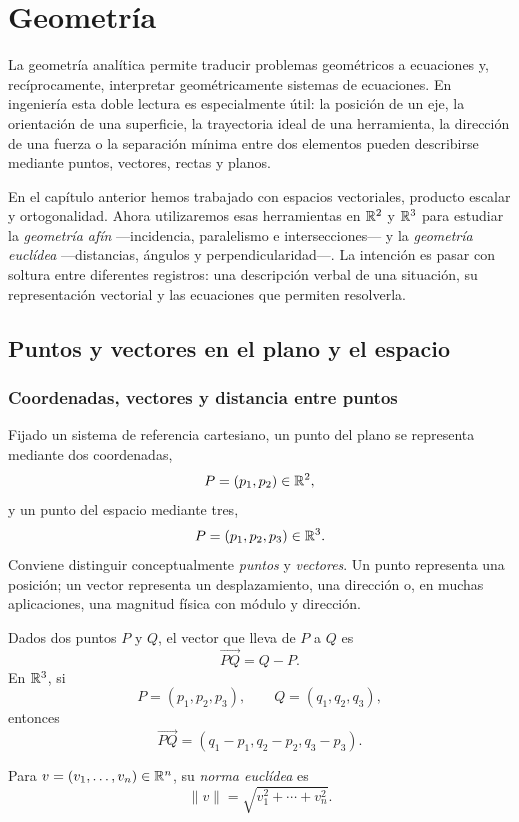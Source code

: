 \chapter{Geometría}
\label{ch:geometria}

La geometría analítica permite traducir problemas geométricos a ecuaciones y, recíprocamente, interpretar geométricamente sistemas de ecuaciones. En ingeniería esta doble lectura es especialmente útil: la posición de un eje, la orientación de una superficie, la trayectoria ideal de una herramienta, la dirección de una fuerza o la separación mínima entre dos elementos pueden describirse mediante puntos, vectores, rectas y planos.

En el capítulo anterior hemos trabajado con espacios vectoriales, producto escalar y ortogonalidad. Ahora utilizaremos esas herramientas en $\mathbb{R}^2$ y $\mathbb{R}^3$ para estudiar la \emph{geometría afín} ---incidencia, paralelismo e intersecciones--- y la \emph{geometría euclídea} ---distancias, ángulos y perpendicularidad---. La intención es pasar con soltura entre diferentes registros: una descripción verbal de una situación, su representación vectorial y las ecuaciones que permiten resolverla.

\section{Puntos y vectores en el plano y el espacio}
\label{sec:geometria-vectores}

\subsection{Coordenadas, vectores y distancia entre puntos}

Fijado un sistema de referencia cartesiano, un punto del plano se representa mediante dos coordenadas,
\[
P=(p_1,p_2)\in\mathbb{R}^2,
\]
y un punto del espacio mediante tres,
\[
P=(p_1,p_2,p_3)\in\mathbb{R}^3.
\]
Conviene distinguir conceptualmente \emph{puntos} y \emph{vectores}. Un punto representa una posición; un vector representa un desplazamiento, una dirección o, en muchas aplicaciones, una magnitud física con módulo y dirección.

Dados dos puntos $P$ y $Q$, el vector que lleva de $P$ a $Q$ es
\[
\overrightarrow{PQ}=Q-P.
\]
En $\mathbb{R}^3$, si
\[
P=(p_1,p_2,p_3),\qquad Q=(q_1,q_2,q_3),
\]
entonces
\[
\overrightarrow{PQ}
=(q_1-p_1,q_2-p_2,q_3-p_3).
\]

\begin{definition}
Para $v=(v_1,\ldots,v_n)\in\mathbb{R}^n$, su \emph{norma euclídea} es
\[
\|v\|=\sqrt{v_1^2+\cdots+v_n^2}.
\]
\end{definition}

